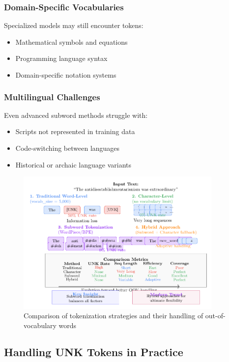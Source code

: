 \subsubsection{Domain-Specific Vocabularies}
Specialized models may still encounter \unk{} tokens:
\begin{itemize}
\item Mathematical symbols and equations
\item Programming language syntax
\item Domain-specific notation systems
\end{itemize}

\subsubsection{Multilingual Challenges}
Even advanced subword methods struggle with:
\begin{itemize}
\item Scripts not represented in training data
\item Code-switching between languages
\item Historical or archaic language variants
\end{itemize}

\begin{figure}[h]
\centering
\includegraphics[width=0.9\textwidth]{part1/chapter02/fig_tokenization_comparison.pdf}
\caption{Comparison of tokenization strategies and their handling of out-of-vocabulary words}
\end{figure}

\subsection{Handling UNK Tokens in Practice}

